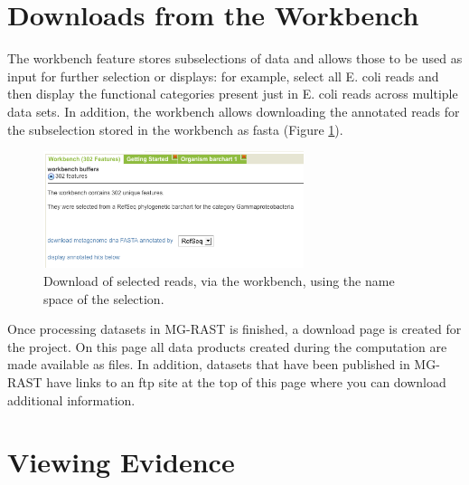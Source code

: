 \documentclass[12pt,fullpage]{report}
\begin{document}
\section{Downloads from the Workbench}

The workbench feature stores subselections of data and allows those to be used as input for further selection or displays: for example, select all E. coli reads and then display the functional categories present just in E. coli reads across multiple data sets. In addition, the workbench allows downloading the annotated reads for the subselection stored in the workbench as fasta (Figure \ref{fig:workbench-download}).

\begin{figure}
\begin{center}
\includegraphics[width=3in]{Images/workbench-download.png}
\end{center}
\caption{
Download of selected reads, via the workbench, using the name space of the selection.
}
\label{fig:workbench-download}
\end{figure}

Once processing datasets in MG-RAST is finished, a download page is created for the project. On this page all data products created during the computation are made available as files. In addition, datasets that have been published in MG-RAST have links to an ftp site at the top of this page where you can download additional information.

\section{Viewing Evidence}
\end{document}
